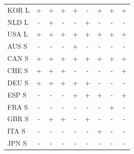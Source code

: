 \documentclass[12pt,bibliography=totoc]{article}
\begin{document}
\begin{table}[H]
\begin{tabular}{l  cccccccc}
KOR L	&\cellcolor{green!25}+	&\cellcolor{green!25}+	&\cellcolor{green!25}+	&\cellcolor{green!25}+	&\cellcolor{red!25}-	&\cellcolor{green!25}+	&\cellcolor{green!25}+	&\cellcolor{green!25}+   \\
NLD L	&\cellcolor{red!25}-	&\cellcolor{green!25}+	&\cellcolor{red!25}-	&\cellcolor{red!25}-	&\cellcolor{green!25}+	&\cellcolor{red!25}-	&\cellcolor{red!25}-	&\cellcolor{red!25}-     \\
USA L	&\cellcolor{green!25}+	&\cellcolor{green!25}+	&\cellcolor{green!25}+	&\cellcolor{green!25}+	&\cellcolor{green!25}+	&\cellcolor{green!25}+	&\cellcolor{green!25}+	&\cellcolor{green!25}+   \\
AUS S	&\cellcolor{red!25}-	&\cellcolor{red!25}-	&\cellcolor{red!25}-	&\cellcolor{green!25}+	&\cellcolor{red!25}-	&\cellcolor{red!25}-	&\cellcolor{red!25}-	&\cellcolor{red!25}-     \\
CAN S	&\cellcolor{green!25}+	&\cellcolor{green!25}+	&\cellcolor{green!25}+	&\cellcolor{green!25}+	&\cellcolor{green!25}+	&\cellcolor{green!25}+	&\cellcolor{green!25}+	&\cellcolor{green!25}+   \\
CHE S	&\cellcolor{green!25}+	&\cellcolor{green!25}+	&\cellcolor{green!25}+	&\cellcolor{red!25}-	&\cellcolor{red!25}-	&\cellcolor{red!25}-	&\cellcolor{red!25}-	&\cellcolor{green!25}+   \\
DEU S	&\cellcolor{green!25}+	&\cellcolor{green!25}+	&\cellcolor{green!25}+	&\cellcolor{green!25}+	&\cellcolor{green!25}+	&\cellcolor{red!25}-	&\cellcolor{red!25}-	&\cellcolor{red!25}-     \\
ESP S	&\cellcolor{red!25}-	&\cellcolor{red!25}-	&\cellcolor{red!25}-	&\cellcolor{green!25}+	&\cellcolor{green!25}+	&\cellcolor{green!25}+	&\cellcolor{red!25}-	&\cellcolor{green!25}+   \\
FRA S	&\cellcolor{red!25}-	&\cellcolor{red!25}-	&\cellcolor{red!25}-	&\cellcolor{red!25}-	&\cellcolor{red!25}-	&\cellcolor{red!25}-	&\cellcolor{green!25}+	&\cellcolor{red!25}-     \\
GBR S	&\cellcolor{red!25}-	&\cellcolor{green!25}+	&\cellcolor{green!25}+	&\cellcolor{red!25}-	&\cellcolor{green!25}+	&\cellcolor{red!25}-	&\cellcolor{red!25}-	&\cellcolor{red!25}-     \\
ITA S	&\cellcolor{red!25}-	&\cellcolor{red!25}-	&\cellcolor{red!25}-	&\cellcolor{red!25}-	&\cellcolor{red!25}-	&\cellcolor{green!25}+	&\cellcolor{red!25}-	&\cellcolor{red!25}-     \\
JPN S	&\cellcolor{red!25}-	&\cellcolor{red!25}-	&\cellcolor{red!25}-	&\cellcolor{red!25}-	&\cellcolor{red!25}-	&\cellcolor{red!25}-	&\cellcolor{red!25}-	&\cellcolor{red!25}-     \\

\end{tabular}
\end{table}
\end{document}
